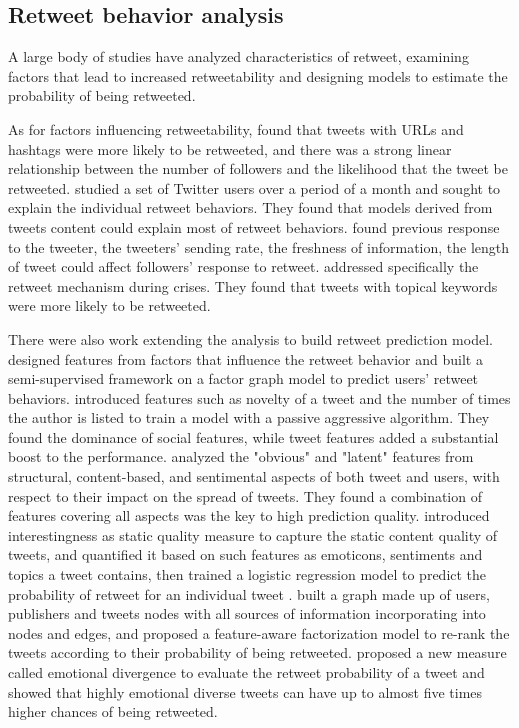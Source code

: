 \documentclass{acm_proc_article-sp}
\begin{document}
\subsection{Retweet behavior analysis}
A large body of studies have analyzed characteristics of retweet, examining factors that lead to increased retweetability and designing models to estimate the probability of being retweeted. 

As for factors influencing retweetability, \cite{Suh2010} found that tweets with URLs and hashtags were more likely to be retweeted, and there was a strong linear relationship between the number of followers and the likelihood that the tweet be retweeted. 
\cite{conf/icwsm/MacskassyM11} studied a set of Twitter users over a period of a month and sought to explain the individual retweet behaviors.
They found that models derived from tweets content could explain most of retweet behaviors.
\cite{Comarela:2012UFA} found previous response to the tweeter, the tweeters’ sending rate, the freshness of information, the length of tweet could affect followers’ response to retweet. 
\cite{Starbird:2012RRI} addressed specifically the retweet mechanism during crises. 
They found that tweets with topical keywords were more likely to be retweeted. 

There were also work extending the analysis to build retweet prediction model. 
\cite{conf/cikm/YangGCTLZS10} designed features from factors that influence the retweet behavior and built a semi-supervised framework on a factor graph model to predict users’ retweet behaviors. 
\cite{Osborne_Lavrenko_2011} introduced features such as novelty of a tweet and the number of times the author is listed to train a model with a passive aggressive algorithm. 
They found the dominance of social features, while tweet features added a substantial boost to the performance.
\cite{Jenders:2013APV} analyzed the "obvious" and "latent" features from structural, content-based, and sentimental aspects of both tweet and users, with respect to their impact on the spread of tweets. 
They found a combination of features covering all aspects was the key to high prediction quality.
\cite{Naveed:2011SMC,2011:NaveedGKC} introduced interestingness as static quality measure to capture the static content quality of tweets, and quantified it based on such features as emoticons, sentiments and topics a tweet contains, then trained a logistic regression model to predict the probability of retweet for an individual tweet .
\cite{conf/wsdm/FengW13} built a graph made up of users, publishers and tweets nodes with all sources of information incorporating into nodes and edges, and proposed a feature-aware factorization model to re-rank the tweets according to their probability of being retweeted.
\cite{conf/icwsm/PfitznerGS12} proposed a new measure called emotional divergence to evaluate the retweet probability of a tweet and showed that highly emotional diverse tweets can have up to almost five times higher chances of being retweeted.
\end{document}
